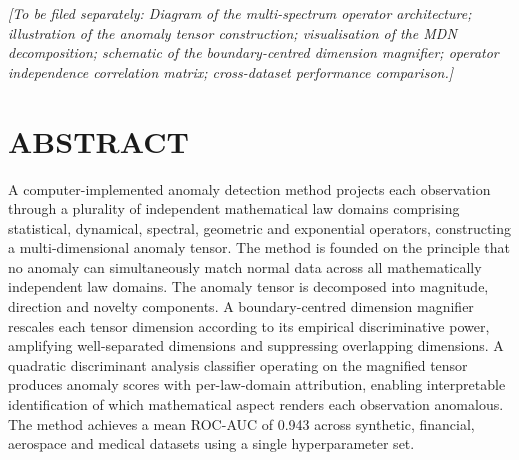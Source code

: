 \documentclass[12pt,a4paper]{article}
\begin{document}
\textit{[To be filed separately: Diagram of the multi-spectrum operator 
architecture; illustration of the anomaly tensor construction; 
visualisation of the MDN decomposition; schematic of the boundary-centred 
dimension magnifier; operator independence correlation matrix; 
cross-dataset performance comparison.]}

\newpage
\section*{ABSTRACT}

A computer-implemented anomaly detection method projects each observation
through a plurality of independent mathematical law domains comprising
statistical, dynamical, spectral, geometric and exponential operators,
constructing a multi-dimensional anomaly tensor. The method is founded on
the principle that no anomaly can simultaneously match normal data across all
mathematically independent law domains. The anomaly tensor is decomposed into
magnitude, direction and novelty components. A boundary-centred dimension
magnifier rescales each tensor dimension according to its empirical
discriminative power, amplifying well-separated dimensions and suppressing
overlapping dimensions. A quadratic discriminant analysis classifier operating
on the magnified tensor produces anomaly scores with per-law-domain
attribution, enabling interpretable identification of which mathematical
aspect renders each observation anomalous. The method achieves a mean
ROC-AUC of 0.943 across synthetic, financial, aerospace and medical datasets
using a single hyperparameter set.
\end{document}
